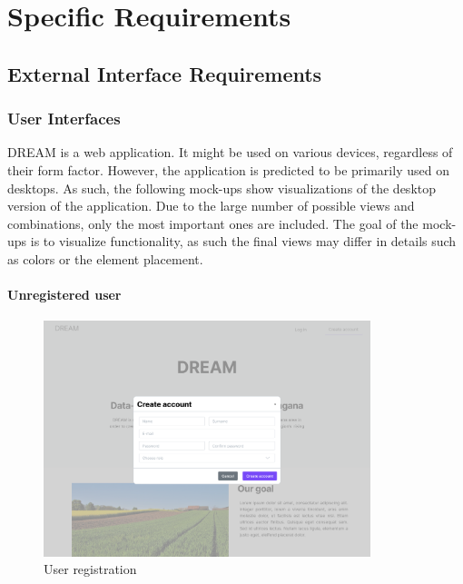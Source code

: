\chapter{Specific Requirements}

\section{External Interface Requirements}

\subsection{User Interfaces}
DREAM is a web application. It might be used on various devices, regardless of their form factor. 
However, the application is predicted to be primarily used on desktops. As such, the following mock-ups show visualizations of the desktop version of the application. Due to the large number of possible views and combinations, only the most important ones are included. The goal of the mock-ups is to visualize functionality, as such the final views may differ in details such as colors or the element placement.

\subsubsection{Unregistered user}

\begin{figure}[H]
\centering
\includegraphics[width=0.85\textwidth]{mockups/Unreg. user_Create account.png}
\caption{User registration}
\end{figure}

